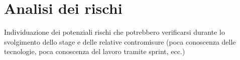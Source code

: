 \section{Analisi dei rischi}
\label{sez:analisi-dei-rischi}

Individuazione dei potenziali rischi che potrebbero verificarsi durante lo svolgimento dello stage e delle relative contromisure (poca conoscenza delle tecnologie, poca conoscenza del lavoro tramite sprint, ecc.)